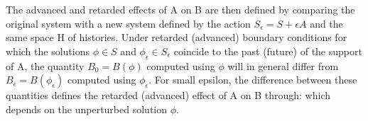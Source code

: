 \documentclass[Main]{subfiles}
\begin{document}
			The advanced  and retarded  effects of A on B are then defined by comparing the original system with a new system defined by the action $S_\epsilon = S + \epsilon A$ and the same space H of histories. 
			Under retarded (advanced) boundary conditions for which the solutions $\phi \in S$ and $\phi_\epsilon	\in S_\epsilon$ coincide to the past (future) of the support of A, the quantity $B_0 = B(\phi)$ computed using $\phi$ will in general differ from $B_\epsilon = B(\phi_\epsilon)$ computed using $\phi_\epsilon$.
			For small epsilon, the difference between these quantities defines the retarded (advanced) effect of A on B through:
which depends on the unperturbed solution $\phi$.
\end{document}
